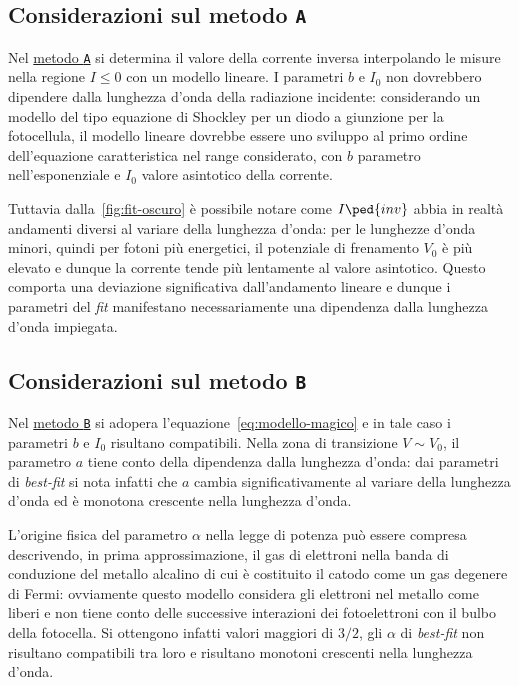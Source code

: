 \documentclass[10pt, a4paper, italian]{article}
\begin{document}
\subsection{Considerazioni sul metodo \texttt{A}}
Nel \hyperref[sec:metodoA]{metodo \texttt{A}} si determina il valore della corrente inversa interpolando le misure nella regione $I \leq 0 $ con un modello lineare. I parametri $ b $ e $ I_{0} $ non dovrebbero dipendere dalla lunghezza d'onda della radiazione incidente: considerando un modello del tipo equazione di Shockley per un diodo a giunzione per la fotocellula, il modello lineare dovrebbe essere uno sviluppo al primo ordine dell'equazione caratteristica nel range considerato, con $ b $ parametro nell'esponenziale e $ I_{0} $ valore asintotico della corrente.

Tuttavia dalla~\eqref{fig:fit-oscuro} è possibile notare come $ I\ped{inv} $ abbia in realtà andamenti diversi al variare della lunghezza d'onda: per le lunghezze d'onda minori, quindi per fotoni più energetici, il potenziale di frenamento $ V_{0} $ è più elevato e dunque la corrente tende più lentamente al valore asintotico. Questo comporta una deviazione significativa dall'andamento lineare e dunque i parametri del \emph{fit} manifestano necessariamente una dipendenza dalla lunghezza d'onda impiegata.

\subsection{Considerazioni sul metodo \texttt{B}}
Nel \hyperref[sec:metodoB]{metodo \texttt{B}} si adopera l'equazione~\eqref{eq:modello-magico} e in tale caso i parametri $ b $ e $ I_{0} $ risultano compatibili. Nella zona di transizione $ V\sim V_{0} $, il parametro $ a $ tiene conto della dipendenza dalla lunghezza d'onda: dai parametri di \emph{best-fit} si nota infatti che $ a $ cambia significativamente al variare della lunghezza d'onda ed è monotona crescente nella lunghezza d'onda.

L'origine fisica del parametro $\alpha$ nella legge di potenza può essere compresa descrivendo, in prima approssimazione, il gas di elettroni nella banda di conduzione del metallo alcalino di cui è costituito il catodo come un gas degenere di Fermi: ovviamente questo modello considera gli elettroni nel metallo come liberi e non tiene conto delle successive interazioni dei fotoelettroni con il bulbo della fotocella. Si ottengono infatti valori maggiori di $ 3/2 $, gli $ \alpha $ di \emph{best-fit} non risultano compatibili tra loro e risultano monotoni crescenti nella lunghezza d'onda.
\end{document}
